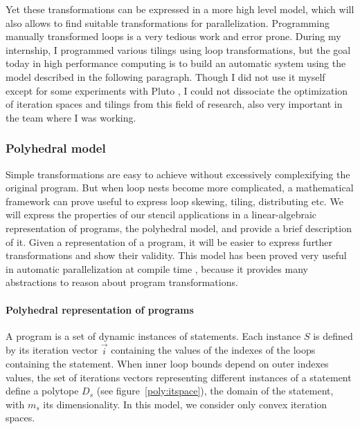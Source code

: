 \documentclass[a4paper,11pt]{article}
\begin{document}
Yet these transformations can be expressed in a more high level model, which will also
allows to find suitable transformations for parallelization. Programming manually transformed 
loops is a very tedious work and error prone. During my internship, I programmed
various tilings using loop transformations, but the goal today in high performance computing 
is to build an automatic system using the model described in the following paragraph.
Though I did not use it myself except for some experiments with Pluto \cite{bondhugula_automatic_2008}, 
I could not dissociate the optimization of iteration spaces
and tilings from this field of research, also very important in the team where I was working.

\subsubsection{Polyhedral model}
Simple transformations are easy to achieve without excessively complexifying the original
program. But when loop nests become more complicated, a mathematical framework can
prove useful to express loop skewing, tiling, distributing etc. We will express the properties
of our stencil applications in a linear-algebraic representation of programs, the polyhedral
model, and provide a brief description of it. Given a representation of a program, it will
be easier to express further transformations and show their validity.
This model has been proved very useful in automatic parallelization at compile time \cite{bastoul_code_2004},
because it provides many abstractions to reason about program transformations.

\paragraph{Polyhedral representation of programs} A program is a set of dynamic instances
of statements. Each instance $S$ is defined by its iteration vector $\vec{i}$ containing the values
of the indexes of the loops containing the statement. When inner loop bounds depend
on outer indexes values, the set of iterations vectors representing different instances of a
statement define a polytope $D_s$ (see figure~\ref{poly:itspace}), the domain of the statement, with 
$m_s$ its dimensionality. In this model, we consider only convex iteration spaces.
\end{document}
